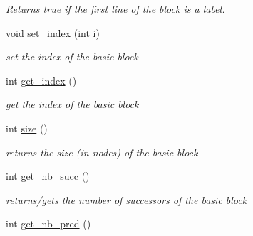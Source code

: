 \begin{DoxyCompactItemize}
\begin{DoxyCompactList}\small\item\em Returns true if the first line of the block is a label. \end{DoxyCompactList}\item 
\hypertarget{class_basic__block_a5bdba6b1e3307dc03c38b8249c4b3fa8}{void \hyperlink{class_basic__block_a5bdba6b1e3307dc03c38b8249c4b3fa8}{set\+\_\+index} (int i)}\label{class_basic__block_a5bdba6b1e3307dc03c38b8249c4b3fa8}

\begin{DoxyCompactList}\small\item\em set the index of the basic block \end{DoxyCompactList}\item 
\hypertarget{class_basic__block_a8cb196904537be8fb0474afce7c769c1}{int \hyperlink{class_basic__block_a8cb196904537be8fb0474afce7c769c1}{get\+\_\+index} ()}\label{class_basic__block_a8cb196904537be8fb0474afce7c769c1}

\begin{DoxyCompactList}\small\item\em get the index of the basic block \end{DoxyCompactList}\item 
\hypertarget{class_basic__block_a5574d52e3ecdbf36e52c42c31bfc73db}{int \hyperlink{class_basic__block_a5574d52e3ecdbf36e52c42c31bfc73db}{size} ()}\label{class_basic__block_a5574d52e3ecdbf36e52c42c31bfc73db}

\begin{DoxyCompactList}\small\item\em returns the size (in nodes) of the basic block \end{DoxyCompactList}\item 
\hypertarget{class_basic__block_a3ccc47a22b9d5d9e932862ab37783225}{int \hyperlink{class_basic__block_a3ccc47a22b9d5d9e932862ab37783225}{get\+\_\+nb\+\_\+succ} ()}\label{class_basic__block_a3ccc47a22b9d5d9e932862ab37783225}

\begin{DoxyCompactList}\small\item\em returns/gets the number of successors of the basic block \end{DoxyCompactList}\item 
\hypertarget{class_basic__block_ade6f71459e5b54108022a16a4a6a00cb}{int \hyperlink{class_basic__block_ade6f71459e5b54108022a16a4a6a00cb}{get\+\_\+nb\+\_\+pred} ()}\label{class_basic__block_ade6f71459e5b54108022a16a4a6a00cb}


\end{DoxyCompactItemize}
